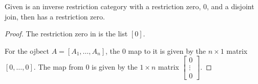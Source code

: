 \begin{lemma}\label{lem:imat_has_restriction_zero}
  Given \X is an inverse restriction category with a restriction zero, $0$, and a disjoint join,
  then \imatx has a restriction zero.
\end{lemma}
\begin{proof}
  The restriction zero in \imatx is the list $[0]$.

  For the ojbect $A=[A_1,\ldots,A_n]$, the $0$ map to it is given by the $n\times 1$ matrix
  $[0,\ldots,0]$. The map from $0$ is given by the $1\times n$ matrix
  $\begin{bmatrix}0\\ \vdots\\ 0\end{bmatrix}$.

\end{proof}

